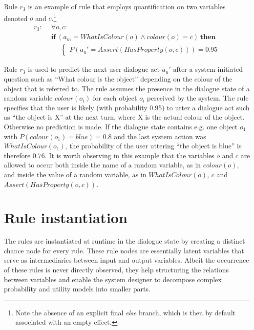 Rule $r_3$ is an example of rule that employs quantification on two variables denoted $o$ and $c$.\footnote{Note the absence of an explicit final \textit{else} branch, which is then by default associated with an empty effect.}
\begin{align*}
r_3: \ \ & \forall o, c: \\ 
& \textbf{if} \ (a_m\!=\!\mathit{WhatIsColour}(o) \land \mathit{colour}(o)\!=\!\mathit{c})  \ \textbf{then} \\ 
& \;\;\;\;\; \begin{cases} P(a_u'=\mathit{Assert}(\mathit{HasProperty}(o,\mathit{c}))) = 0.95 \end{cases}
\end{align*}

Rule $r_3$ is used to predict the next user dialogue act $a_u'$ after a system-initiated question such as ``What colour is the object'' depending on the colour of the object that is referred to. The rule assumes the presence in the dialogue state of a random variable $colour(o_i)$ for each object $o_i$ perceived by the system. The rule specifies that the user is likely (with probability 0.95) to utter a dialogue act such as ``the object is X'' at the next turn, where X is the actual colour of the object. Otherwise no prediction is made. If the dialogue state contains e.g. one object $o_1$ with $P(\mathit{colour}(o_1)=blue)=0.8$ and the last system action was $WhatIsColour(o_1)$, the probability of the user uttering ``the object is blue'' is therefore $0.76$.  It is worth observing in this example that the variables $o$ and $c$ are allowed to occur both inside the name of a random variable, as in $\mathit{colour}(o)$, and inside the value of a random variable, as in $\mathit{WhatIsColour(o)}$, $c$ and $\mathit{Assert}(\mathit{HasProperty}(o,\mathit{c}))$. 

\section{Rule instantiation}
\label{sec:ruleinstantiation}

The rules are instantiated at runtime in the dialogue state by creating a distinct chance node for every rule.  These rule nodes are essentially latent variables that serve as intermediaries between input and output variables.  Albeit the occurrence of these rules is never directly observed, they help structuring the relations between variables and enable the system designer to decompose complex probability and utility models into smaller parts.  

